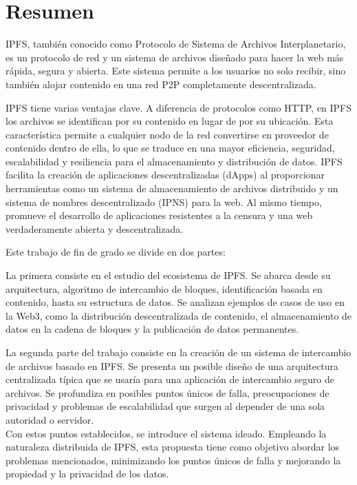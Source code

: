 \chapter*{Resumen}

IPFS, también conocido como Protocolo de Sistema de Archivos Interplanetario,
es un protocolo de red y un sistema de archivos diseñado para hacer
la web más rápida, segura y abierta. Este sistema permite a los usuarios no
solo recibir, sino también alojar contenido en una red P2P completamente descentralizada.

IPFS tiene varias ventajas clave. A diferencia de protocolos como HTTP, en IPFS los archivos se identifican
por su contenido en lugar de por su ubicación. Esta característica permite a cualquier nodo de la red
convertirse en proveedor de contenido dentro de ella, lo que se traduce en una mayor eficiencia, seguridad,
escalabilidad y resiliencia para el almacenamiento y distribución de datos.
IPFS facilita la creación de aplicaciones descentralizadas (dApps) al proporcionar herramientas como
un sistema de almacenamiento de archivos distribuido y un sistema de nombres descentralizado (IPNS) para la web. Al mismo tiempo, promueve el desarrollo de aplicaciones resistentes a la censura y una web verdaderamente abierta y descentralizada.

Este trabajo de fin de grado se divide en dos partes:

La primera consiste en el estudio del ecosistema de IPFS. Se abarca desde su arquitectura, algoritmo de intercambio de bloques,
identificación basada en contenido, hasta su estructura de datos. Se analizan ejemplos de casos de uso en la
Web3, como la distribución descentralizada de contenido, el almacenamiento de datos en la cadena de bloques y
la publicación de datos permanentes.

La segunda parte del trabajo consiste en la creación de un sistema de intercambio de archivos basado en IPFS.
Se presenta un posible diseño de una arquitectura centralizada típica que se usaría para una aplicación de intercambio seguro de archivos.
Se profundiza en posibles puntos únicos de falla, preocupaciones de privacidad y problemas de escalabilidad que surgen al depender de una sola autoridad o servidor.
\\Con estos puntos establecidos, se introduce el sistema ideado. Empleando la naturaleza distribuida de IPFS, esta propuesta tiene como objetivo abordar los problemas mencionados, minimizando los puntos únicos de falla y mejorando la propiedad y la privacidad de los datos.

